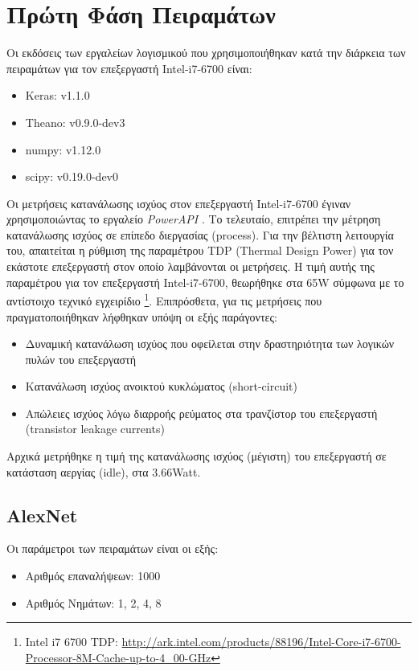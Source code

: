\section{Πρώτη Φάση Πειραμάτων}
\label{sec:experiments_phase1}

Οι εκδόσεις των εργαλείων λογισμικού που χρησιμοποιήθηκαν
κατά την διάρκεια των πειραμάτων για τον επεξεργαστή Intel-i7-6700 είναι:
\begin{itemize}
  \item{Keras: v1.1.0}
  \item{Theano: v0.9.0-dev3}
  \item{numpy: v1.12.0}
  \item{scipy: v0.19.0-dev0}
\end{itemize}

Οι μετρήσεις κατανάλωσης ισχύος στον επεξεργαστή Intel-i7-6700 έγιναν
χρησιμοποιώντας το εργαλείο \emph{PowerAPI} \cite{grant2016standardizing}.
Το τελευταίο, επιτρέπει την μέτρηση κατανάλωσης ισχύος σε
επίπεδο διεργασίας (process). Για την βέλτιστη λειτουργία του,
απαιτείται η ρύθμιση της παραμέτρου TDP (Thermal Design Power) για τον εκάστοτε
επεξεργαστή στον οποίο λαμβάνονται οι μετρήσεις. Η τιμή αυτής της παραμέτρου για τον επεξεργαστή
Intel-i7-6700, θεωρήθηκε στα 65W σύμφωνα με το αντίστοιχο τεχνικό εγχειρίδιο
\footnote{Intel i7 6700 TDP: \url{http://ark.intel.com/products/88196/Intel-Core-i7-6700-Processor-8M-Cache-up-to-4_00-GHz}}.
Επιπρόσθετα, για τις μετρήσεις που πραγματοποιήθηκαν λήφθηκαν υπόψη οι εξής παράγοντες:
\begin{itemize}
  \item{Δυναμική κατανάλωση ισχύος που οφείλεται στην δραστηριότητα των λογικών πυλών του επεξεργαστή}
  \item{Κατανάλωση ισχύος ανοικτού κυκλώματος (short-circuit)}
  \item{Απώλειες ισχύος λόγω διαρροής ρεύματος στα τρανζίστορ του επεξεργαστή (transistor leakage currents)}
\end{itemize}

Αρχικά μετρήθηκε η τιμή της κατανάλωσης ισχύος (μέγιστη) του επεξεργαστή σε
κατάσταση αεργίας (idle), στα $3.66$Watt.

\subsection{AlexNet}

Οι παράμετροι των πειραμάτων είναι οι εξής:
\begin{itemize}
  \item{Αριθμός επαναλήψεων: 1000}
  \item{Αριθμός Νημάτων: 1, 2, 4, 8}
\end{itemize}

